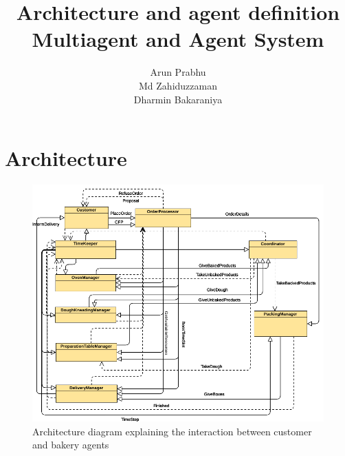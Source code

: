 \documentclass[12pt]{article}
\title{Architecture and agent definition\\Multiagent and Agent System}
\author{Arun Prabhu\\Md Zahiduzzaman\\Dharmin Bakaraniya}
\begin{document}
\maketitle{}
\pagebreak
\section{Architecture}%
\label{sec:architecture}

\begin{figure}[htpb]
    \centering
    \includegraphics[width=1.0\linewidth]{Bakery.png}
    \caption{Architecture diagram explaining the interaction between customer and bakery agents}\label{fig:somename}
\end{figure}

\pagebreak
\end{document}
